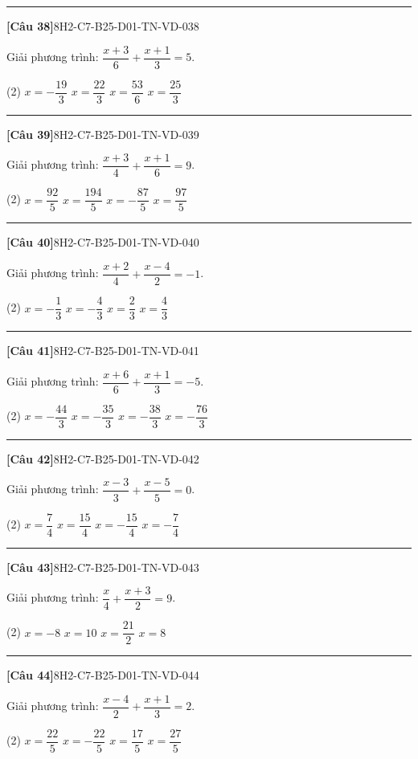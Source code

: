 \documentclass[12pt,a4paper]{article}
\newif\ifloigiai
\newenvironment{cauhoi}[2]{%
  \par\medskip\noindent\rule{\textwidth}{0.4pt}\par\nopagebreak
  \noindent\textbf{[#1]}\hfill{\scriptsize\ttfamily #2}\par\nopagebreak\smallskip}{\par}
\newcommand{\dapan}[1]{\ifloigiai\par\smallskip\noindent\textit{Đáp án:} \textbf{#1}\par\fi}
\begin{document}
\begin{cauhoi}{Câu 38}{8H2-C7-B25-D01-TN-VD-038}
Giải phương trình: $\dfrac{x + 3}{6}+\dfrac{x + 1}{3}=5$.
\begin{tasks}(2)
\task $x=-\dfrac{19}{3}$
\task $x=\dfrac{22}{3}$
\task $x=\dfrac{53}{6}$
\task $x=\dfrac{25}{3}$
\end{tasks}
\dapan{D}
\end{cauhoi}
\begin{cauhoi}{Câu 39}{8H2-C7-B25-D01-TN-VD-039}
Giải phương trình: $\dfrac{x + 3}{4}+\dfrac{x + 1}{6}=9$.
\begin{tasks}(2)
\task $x=\dfrac{92}{5}$
\task $x=\dfrac{194}{5}$
\task $x=-\dfrac{87}{5}$
\task $x=\dfrac{97}{5}$
\end{tasks}
\dapan{D}
\end{cauhoi}
\begin{cauhoi}{Câu 40}{8H2-C7-B25-D01-TN-VD-040}
Giải phương trình: $\dfrac{x + 2}{4}+\dfrac{x - 4}{2}=-1$.
\begin{tasks}(2)
\task $x=-\dfrac{1}{3}$
\task $x=-\dfrac{4}{3}$
\task $x=\dfrac{2}{3}$
\task $x=\dfrac{4}{3}$
\end{tasks}
\dapan{C}
\end{cauhoi}
\begin{cauhoi}{Câu 41}{8H2-C7-B25-D01-TN-VD-041}
Giải phương trình: $\dfrac{x + 6}{6}+\dfrac{x + 1}{3}=-5$.
\begin{tasks}(2)
\task $x=-\dfrac{44}{3}$
\task $x=-\dfrac{35}{3}$
\task $x=-\dfrac{38}{3}$
\task $x=-\dfrac{76}{3}$
\end{tasks}
\dapan{C}
\end{cauhoi}
\begin{cauhoi}{Câu 42}{8H2-C7-B25-D01-TN-VD-042}
Giải phương trình: $\dfrac{x - 3}{3}+\dfrac{x - 5}{5}=0$.
\begin{tasks}(2)
\task $x=\dfrac{7}{4}$
\task $x=\dfrac{15}{4}$
\task $x=-\dfrac{15}{4}$
\task $x=-\dfrac{7}{4}$
\end{tasks}
\dapan{B}
\end{cauhoi}
\begin{cauhoi}{Câu 43}{8H2-C7-B25-D01-TN-VD-043}
Giải phương trình: $\dfrac{x}{4}+\dfrac{x + 3}{2}=9$.
\begin{tasks}(2)
\task $x=-8$
\task $x=10$
\task $x=\dfrac{21}{2}$
\task $x=8$
\end{tasks}
\dapan{B}
\end{cauhoi}
\begin{cauhoi}{Câu 44}{8H2-C7-B25-D01-TN-VD-044}
Giải phương trình: $\dfrac{x - 4}{2}+\dfrac{x + 1}{3}=2$.
\begin{tasks}(2)
\task $x=\dfrac{22}{5}$
\task $x=-\dfrac{22}{5}$
\task $x=\dfrac{17}{5}$
\task $x=\dfrac{27}{5}$
\end{tasks}
\dapan{A}
\end{cauhoi}
\end{document}
